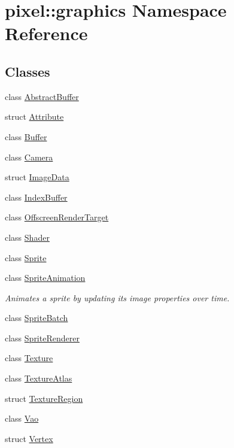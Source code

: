 \hypertarget{namespacepixel_1_1graphics}{}\section{pixel\+:\+:graphics Namespace Reference}
\label{namespacepixel_1_1graphics}
\subsection*{Classes}
\begin{DoxyCompactItemize}
\item 
class \hyperlink{classpixel_1_1graphics_1_1_abstract_buffer}{Abstract\+Buffer}
\item 
struct \hyperlink{structpixel_1_1graphics_1_1_attribute}{Attribute}
\item 
class \hyperlink{classpixel_1_1graphics_1_1_buffer}{Buffer}
\item 
class \hyperlink{classpixel_1_1graphics_1_1_camera}{Camera}
\item 
struct \hyperlink{structpixel_1_1graphics_1_1_image_data}{Image\+Data}
\item 
class \hyperlink{classpixel_1_1graphics_1_1_index_buffer}{Index\+Buffer}
\item 
class \hyperlink{classpixel_1_1graphics_1_1_offscreen_render_target}{Offscreen\+Render\+Target}
\item 
class \hyperlink{classpixel_1_1graphics_1_1_shader}{Shader}
\item 
class \hyperlink{classpixel_1_1graphics_1_1_sprite}{Sprite}
\item 
class \hyperlink{classpixel_1_1graphics_1_1_sprite_animation}{Sprite\+Animation}
\begin{DoxyCompactList}\small\item\em Animates a sprite by updating its image properties over time. \end{DoxyCompactList}\item 
class \hyperlink{classpixel_1_1graphics_1_1_sprite_batch}{Sprite\+Batch}
\item 
class \hyperlink{classpixel_1_1graphics_1_1_sprite_renderer}{Sprite\+Renderer}
\item 
class \hyperlink{classpixel_1_1graphics_1_1_texture}{Texture}
\item 
class \hyperlink{classpixel_1_1graphics_1_1_texture_atlas}{Texture\+Atlas}
\item 
struct \hyperlink{structpixel_1_1graphics_1_1_texture_region}{Texture\+Region}
\item 
class \hyperlink{classpixel_1_1graphics_1_1_vao}{Vao}
\item 
struct \hyperlink{structpixel_1_1graphics_1_1_vertex}{Vertex}
\end{DoxyCompactItemize}
